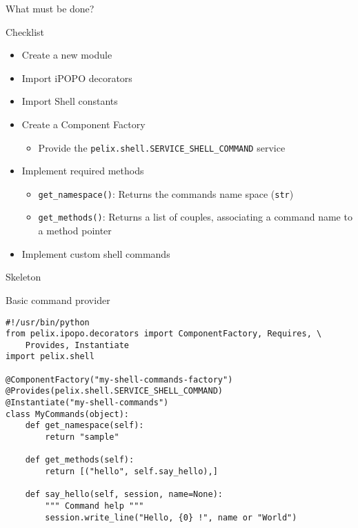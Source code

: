 \begin{frame}{What must be done?}
\begin{block}{Checklist}
\begin{itemize}
\item Create a new module
\item Import iPOPO decorators
\item Import Shell constants
\item Create a Component Factory
\begin{itemize}
\item Provide the \texttt{\scriptsize pelix.shell.SERVICE\_SHELL\_COMMAND} service
\end{itemize}
\item Implement required methods
\begin{itemize}
\item \texttt{\scriptsize get\_namespace()}: Returns the commands name space (\texttt{\scriptsize str})
\item \texttt{\scriptsize get\_methods()}: Returns a list of couples, associating a command name to a method pointer
\end{itemize}
\item Implement custom shell commands
\end{itemize}
\end{block}
\end{frame}

\begin{frame}[fragile]{Skeleton}
\begin{block}{Basic command provider}
\begin{verbatim}
#!/usr/bin/python
from pelix.ipopo.decorators import ComponentFactory, Requires, \
    Provides, Instantiate
import pelix.shell

@ComponentFactory("my-shell-commands-factory")
@Provides(pelix.shell.SERVICE_SHELL_COMMAND)
@Instantiate("my-shell-commands")
class MyCommands(object):
    def get_namespace(self):
        return "sample"

    def get_methods(self):
        return [("hello", self.say_hello),]

    def say_hello(self, session, name=None):
        """ Command help """
        session.write_line("Hello, {0} !", name or "World")
\end{verbatim}
\end{block}
\end{frame}
